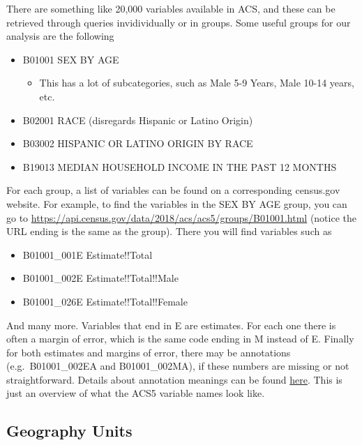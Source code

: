 \documentclass[openany]{book}
\providecommand{\tightlist}{%
  \setlength{\itemsep}{0pt}\setlength{\parskip}{0pt}}
\begin{document}
There are something like 20,000 variables available in ACS, and these can be retrieved through queries invidividually or in groups. Some useful groups for our analysis are the following

\begin{itemize}
\tightlist
\item
  B01001 SEX BY AGE

  \begin{itemize}
  \tightlist
  \item
    This has a lot of subcategories, such as Male 5-9 Years, Male 10-14 years, etc.
  \end{itemize}
\item
  B02001 RACE (disregards Hispanic or Latino Origin)
\item
  B03002 HISPANIC OR LATINO ORIGIN BY RACE\\
\item
  B19013 MEDIAN HOUSEHOLD INCOME IN THE PAST 12 MONTHS
\end{itemize}

For each group, a list of variables can be found on a corresponding census.gov website. For example, to find the variables in the SEX BY AGE group, you can go to \url{https://api.census.gov/data/2018/acs/acs5/groups/B01001.html} (notice the URL ending is the same as the group). There you will find variables such as

\begin{itemize}
\tightlist
\item
  B01001\_001E Estimate!!Total
\item
  B01001\_002E Estimate!!Total!!Male
\item
  B01001\_026E Estimate!!Total!!Female
\end{itemize}

And many more. Variables that end in E are estimates. For each one there is often a margin of error, which is the same code ending in M instead of E. Finally for both estimates and margins of error, there may be annotations (e.g.~B01001\_002EA and B01001\_002MA), if these numbers are missing or not straightforward. Details about annotation meanings can be found \href{https://www.census.gov/data/developers/data-sets/acs-1year/notes-on-acs-estimate-and-annotation-values.html}{here}. This is just an overview of what the ACS5 variable names look like.

\hypertarget{geography-units}{%
\subsection*{Geography Units}\label{geography-units}}
\end{document}
